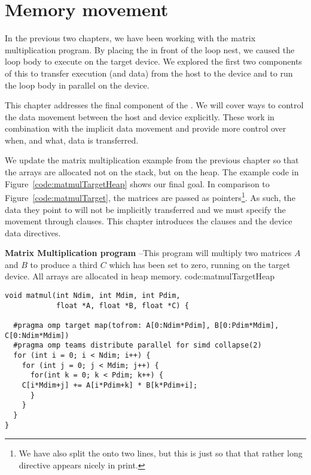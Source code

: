 
\def\ArtDir{05.MemMove/figures}%

\chapter{Memory movement}
\label{chapter:memory}

In the previous two chapters, we have been working with the matrix multiplication program.
By placing the \BUD in front of the loop nest, we caused the loop body to execute on the target device.
We explored the first two components of this \BUD to transfer execution (and data) from the host to the device and to run the loop body in parallel on the device.

This chapter addresses the final component of the \BUD.
We will cover ways to control the data movement between the host and device explicitly.
These work in combination with the implicit data movement and provide more control over when, and what, data is transferred.

We update the matrix multiplication example from the previous chapter so that the arrays are allocated not on the stack, but on the heap. The example code in Figure~\ref{code:matmulTargetHeap} shows our final goal. In comparison to Figure~\ref{code:matmulTarget}, the matrices are passed as pointers\footnote{We have also split the \BUD onto two lines, but this is just so that that rather long directive appears nicely in print.}. As such, the data they point to will not be implicitly transferred and we must specify the movement through  clauses.
This chapter introduces the  clauses and the device data directives.

\begin{CodeExample}%
{\textbf{Matrix Multiplication program} --\small This program will multiply two matrices $A$ and $B$
to produce a third $C$ which has been set to zero, running on the target device.
All arrays are allocated in heap memory.
}%
{code:matmulTargetHeap}
\begin{lstlisting}
void matmul(int Ndim, int Mdim, int Pdim,
            float *A, float *B, float *C) {

  #pragma omp target map(tofrom: A[0:Ndim*Pdim], B[0:Pdim*Mdim], C[0:Ndim*Mdim])
  #pragma omp teams distribute parallel for simd collapse(2)
  for (int i = 0; i < Ndim; i++) {
    for (int j = 0; j < Mdim; j++) {
      for(int k = 0; k < Pdim; k++) {
	C[i*Mdim+j] += A[i*Pdim+k] * B[k*Pdim+i];
      }
    }
  }
}
\end{lstlisting}
\end{CodeExample}



